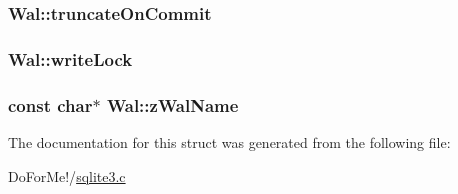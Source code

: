 \hypertarget{struct_wal_a12870bbe7755271c94c3eb1fd0280c56}{
\subsubsection[{truncate\-On\-Commit}]{ Wal\-::truncate\-On\-Commit}}\label{struct_wal_a12870bbe7755271c94c3eb1fd0280c56}
\hypertarget{struct_wal_ad7f4ba84f07115b7ce3a6133479c9d24}{
\subsubsection[{write\-Lock}]{ Wal\-::write\-Lock}}\label{struct_wal_ad7f4ba84f07115b7ce3a6133479c9d24}
\hypertarget{struct_wal_ac54961758701702d67eaf3ce15c69ea5}{
\subsubsection[{z\-Wal\-Name}]{\setlength{\rightskip}{0pt plus 5cm}const char$\ast$ Wal\-::z\-Wal\-Name}}\label{struct_wal_ac54961758701702d67eaf3ce15c69ea5}


The documentation for this struct was generated from the following file\-:\begin{DoxyCompactItemize}
\item 
Do\-For\-Me!/\hyperlink{sqlite3_8c}{sqlite3.\-c}\end{DoxyCompactItemize}
